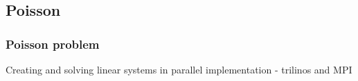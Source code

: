 \documentclass{beamer}
\begin{document}
\subsection{Poisson}
\begin{frame}[shrink=20]%
\frametitle{Poisson problem}
\scriptsize
\begin{minipage}[t][1\textheight]{1\textwidth}
\vspace{-20pt}
\begin{exampleblock}{Creating and solving linear systems in parallel implementation - trilinos and MPI}
\vspace{-20pt}
\begin{figure}
\label{fig:Poisson}
\centering
{}

\end{figure}
\end{exampleblock}
\end{minipage}
\end{frame}
\end{document}
